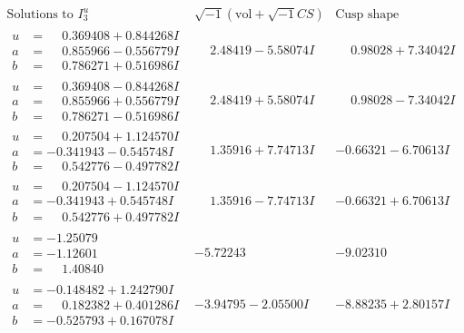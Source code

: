 \documentclass[1p]{elsarticle_modified}
\theoremstyle{definition}
\newcommand{\I}{\sqrt{-1}}
\begin{document}
$$\begin{array}{c|c|c}  
\text{Solutions to }I^u_{3}& \I (\text{vol} + \sqrt{-1}CS) & \text{Cusp shape}\\
 \hline 
\begin{aligned}
u &= \phantom{-}0.369408 + 0.844268 I \\
a &= \phantom{-}0.855966 - 0.556779 I \\
b &= \phantom{-}0.786271 + 0.516986 I\end{aligned}
 & \phantom{-}2.48419 - 5.58074 I & \phantom{-}0.98028 + 7.34042 I \\ \hline\begin{aligned}
u &= \phantom{-}0.369408 - 0.844268 I \\
a &= \phantom{-}0.855966 + 0.556779 I \\
b &= \phantom{-}0.786271 - 0.516986 I\end{aligned}
 & \phantom{-}2.48419 + 5.58074 I & \phantom{-}0.98028 - 7.34042 I \\ \hline\begin{aligned}
u &= \phantom{-}0.207504 + 1.124570 I \\
a &= -0.341943 - 0.545748 I \\
b &= \phantom{-}0.542776 - 0.497782 I\end{aligned}
 & \phantom{-}1.35916 + 7.74713 I & -0.66321 - 6.70613 I \\ \hline\begin{aligned}
u &= \phantom{-}0.207504 - 1.124570 I \\
a &= -0.341943 + 0.545748 I \\
b &= \phantom{-}0.542776 + 0.497782 I\end{aligned}
 & \phantom{-}1.35916 - 7.74713 I & -0.66321 + 6.70613 I \\ \hline\begin{aligned}
u &= -1.25079\phantom{ +0.000000I} \\
a &= -1.12601\phantom{ +0.000000I} \\
b &= \phantom{-}1.40840\phantom{ +0.000000I}\end{aligned}
 & -5.72243\phantom{ +0.000000I} & -9.02310\phantom{ +0.000000I} \\ \hline\begin{aligned}
u &= -0.148482 + 1.242790 I \\
a &= \phantom{-}0.182382 + 0.401286 I \\
b &= -0.525793 + 0.167078 I\end{aligned}
 & -3.94795 - 2.05500 I & -8.88235 + 2.80157 I \\ \hline\begin{aligned}

\end{aligned}
\end{array}$$
\end{document}

